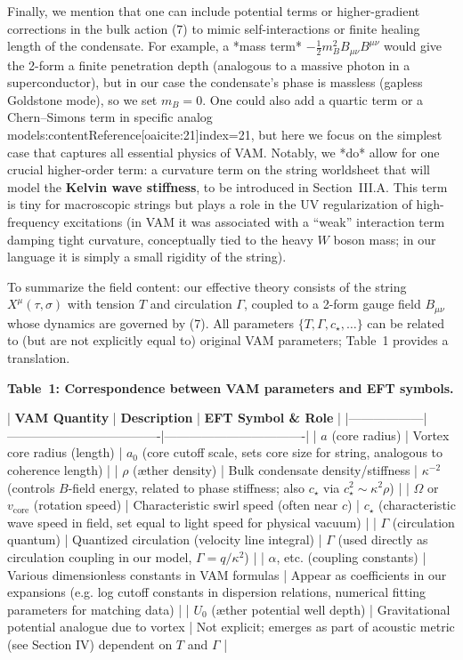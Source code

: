 \documentclass[12pt]{article}
\begin{document}
Finally, we mention that one can include potential terms or higher-gradient corrections in the bulk action (7) to mimic self-interactions or finite healing length of the condensate. For example, a *mass term* $-\frac{1}{2} m_B^2 B_{\mu\nu}B^{\mu\nu}$ would give the 2-form a finite penetration depth (analogous to a massive photon in a superconductor), but in our case the condensate’s phase is massless (gapless Goldstone mode), so we set $m_B=0$. One could also add a quartic term or a Chern–Simons term in specific analog models:contentReference[oaicite:21]{index=21}, but here we focus on the simplest case that captures all essential physics of VAM. Notably, we *do* allow for one crucial higher-order term: a curvature term on the string worldsheet that will model the \textbf{Kelvin wave stiffness}, to be introduced in Section III.A. This term is tiny for macroscopic strings but plays a role in the UV regularization of high-frequency excitations (in VAM it was associated with a “weak” interaction term damping tight curvature, conceptually tied to the heavy $W$ boson mass; in our language it is simply a small rigidity of the string).

To summarize the field content: our effective theory consists of the string $X^\mu(\tau,\sigma)$ with tension $T$ and circulation $\Gamma$, coupled to a 2-form gauge field $B_{\mu\nu}$ whose dynamics are governed by (7). All parameters $\{T,\Gamma,c_\star,\ldots\}$ can be related to (but are not explicitly equal to) original VAM parameters; Table 1 provides a translation. 

\textbf{Table 1: Correspondence between VAM parameters and EFT symbols.}

| \textbf{VAM Quantity} | \textbf{Description}                     | \textbf{EFT Symbol & Role}            |
|------------------|-------------------------------------|----------------------------------|
| $a$ (core radius)           | Vortex core radius (length)     | $a_0$ (core cutoff scale, sets core size for string, analogous to coherence length) |
| $\rho$ (æther density)      | Bulk condensate density/stiffness | $\kappa^{-2}$ (controls $B$-field energy, related to phase stiffness; also $c_\star$ via $c_\star^2 \sim \kappa^2 \rho$) |
| $\Omega$ or $v_{\text{core}}$ (rotation speed) | Characteristic swirl speed (often near $c$) | $c_\star$ (characteristic wave speed in field, set equal to light speed for physical vacuum) |
| $\Gamma$ (circulation quantum) | Quantized circulation (velocity line integral) | $\Gamma$ (used directly as circulation coupling in our model, $\Gamma = q/\kappa^2$) |
| $\alpha$, etc. (coupling constants) | Various dimensionless constants in VAM formulas | Appear as coefficients in our expansions (e.g. log cutoff constants in dispersion relations, numerical fitting parameters for matching data) |
| $U_0$ (æther potential well depth) | Gravitational potential analogue due to vortex | Not explicit; emerges as part of acoustic metric (see Section IV) dependent on $T$ and $\Gamma$ |
\end{document}
